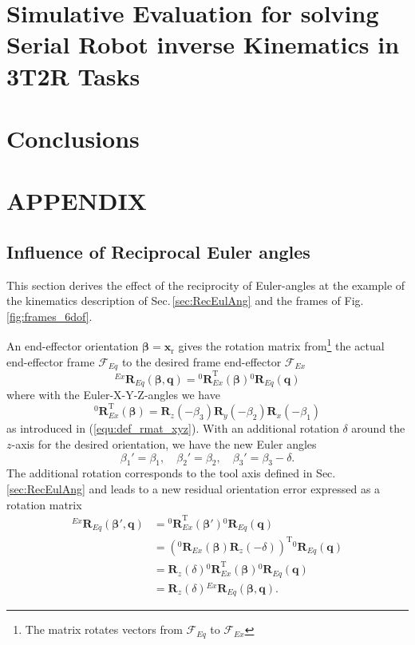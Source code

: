 \documentclass[twocolumn,10pt]{IFTOMM}
\newcommand{\bm}[1]{\boldsymbol{#1}}
\newcommand{\rotmat}[2]{{{ }^{#1}\boldsymbol{R}}_{#2}}
\newcommand{\transp}[0]{{\mathrm{T}}}
\newcommand{\ks}[1]{{\mathcal{F}}_{#1}}
\begin{document}
\section{Simulative Evaluation for solving Serial Robot inverse Kinematics in 3T2R Tasks}
\label{sec:SimEvalSerRobIK}

\section{Conclusions}
\label{sec:Conclusion}

\section{APPENDIX}

\subsection{Influence of Reciprocal Euler angles}
\label{sec:appendix_eulerreciproc}

This section derives the effect of the reciprocity of Euler-angles at the example of the kinematics description of Sec.\,\ref{sec:RecEulAng} and the frames of Fig.\,\ref{fig:frames_6dof}.

An end-effector orientation $\bm{\beta}=\bm{x}_{\mathrm{r}}$ gives the rotation matrix from\footnote{The matrix rotates vectors from $\ks{Eq}$ to $\ks{Ex}$} the actual end-effector frame $\ks{Eq}$ to the desired frame end-effector $\ks{Ex}$
%
\begin{equation}
\rotmat{Ex}{Eq}(\bm{\beta},\bm{q})
= 
\rotmat{0}{Ex}^\transp (\bm{\beta})\rotmat{0}{Eq}(\bm{q})
\end{equation}
%
where with the Euler-X-Y-Z-angles we have
%
\begin{equation}
\rotmat{0}{Ex}^\transp(\bm{\beta})
=
\bm{R}_z(-\beta_3) \bm{R}_y(-\beta_2) \bm{R}_x(-\beta_1)
\end{equation}
%
as introduced in (\ref{equ:def_rmat_xyz}).
With an additional rotation $\delta$ around the $z$-axis for the desired orientation, we have the new Euler angles
%
\begin{equation}
\beta_1'=\beta_1,  \quad \beta_2'=\beta_2,  \quad \beta_3'=\beta_3-\delta.
\end{equation}
%
The additional rotation corresponds to the tool axis defined in Sec.\,\ref{sec:RecEulAng} %
and leads to a new residual orientation error expressed as a rotation matrix
%
\begin{align}
\rotmat{Ex}{Eq}(\bm{\beta}',\bm{q})
&=
\rotmat{0}{Ex}^\transp (\bm{\beta}') \rotmat{0}{Eq}(\bm{q}) \nonumber\\
&=
\left(\rotmat{0}{Ex}(\bm{\beta})\bm{R}_z(-\delta)\right)^\transp \rotmat{0}{Eq}(\bm{q}) \nonumber \\
&=
\bm{R}_z(\delta) \rotmat{0}{Ex}^\transp (\bm{\beta}) \rotmat{0}{Eq}(\bm{q}) \nonumber \\
&=
\bm{R}_z(\delta) \rotmat{Ex}{Eq}(\bm{\beta},\bm{q}).
\end{align}
\end{document}
